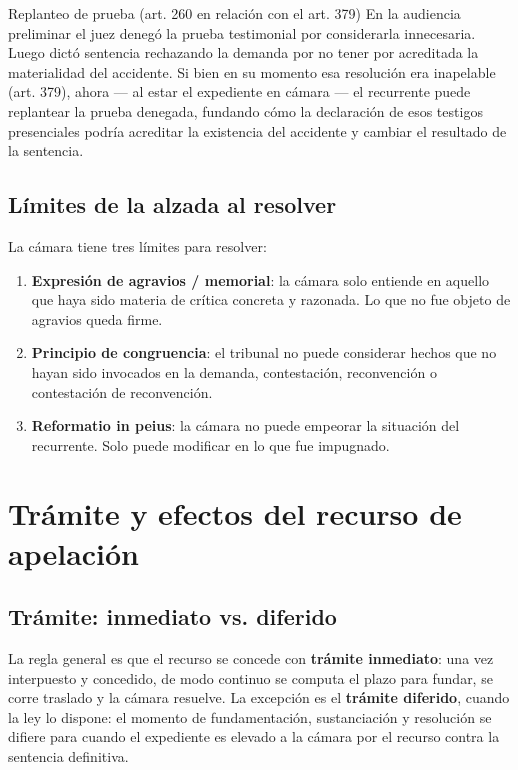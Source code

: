 \documentclass[12pt,oneside]{book}
\begin{document}
\begin{example}{Replanteo de prueba (art. 260 en relación con el art. 379)}
En la audiencia preliminar el juez denegó la prueba testimonial por considerarla innecesaria. Luego dictó sentencia rechazando la demanda por no tener por acreditada la materialidad del accidente. Si bien en su momento esa resolución era inapelable (art. 379), ahora --- al estar el expediente en cámara --- el recurrente puede replantear la prueba denegada, fundando cómo la declaración de esos testigos presenciales podría acreditar la existencia del accidente y cambiar el resultado de la sentencia.
\end{example}

\section{Límites de la alzada al resolver}

La cámara tiene tres límites para resolver:

\begin{enumerate}
\item \textbf{Expresión de agravios / memorial}: la cámara solo entiende en aquello que haya sido materia de crítica concreta y razonada. Lo que no fue objeto de agravios queda firme.
\item \textbf{Principio de congruencia}: el tribunal no puede considerar hechos que no hayan sido invocados en la demanda, contestación, reconvención o contestación de reconvención.
\item \textbf{Reformatio in peius}: la cámara no puede empeorar la situación del recurrente. Solo puede modificar en lo que fue impugnado.
\end{enumerate}

\chapter{Trámite y efectos del recurso de apelación}

\section{Trámite: inmediato vs. diferido}

La regla general es que el recurso se concede con \textbf{trámite inmediato}: una vez interpuesto y concedido, de modo continuo se computa el plazo para fundar, se corre traslado y la cámara resuelve. La excepción es el \textbf{trámite diferido}, cuando la ley lo dispone: el momento de fundamentación, sustanciación y resolución se difiere para cuando el expediente es elevado a la cámara por el recurso contra la sentencia definitiva.
\end{document}
